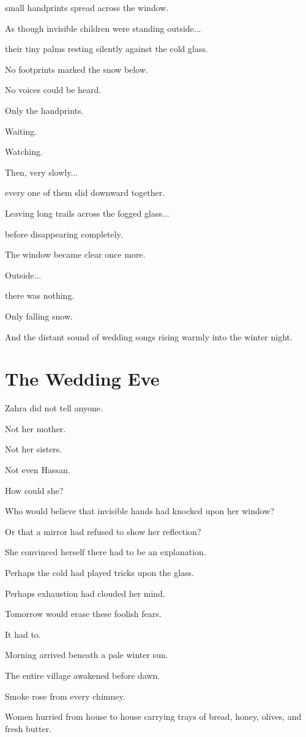 \documentclass[12pt,openany]{book}
\begin{document}
small handprints spread across the window.

As though invisible children were standing outside...

their tiny palms resting silently against the cold glass.

No footprints marked the snow below.

No voices could be heard.

Only the handprints.

Waiting.

Watching.

Then, very slowly...

every one of them slid downward together.

Leaving long trails across the fogged glass...

before disappearing completely.

The window became clear once more.

Outside...

there was nothing.

Only falling snow.

And the distant sound of wedding songs rising warmly into the winter night.
\section*{The Wedding Eve}

Zahra did not tell anyone.

Not her mother.

Not her sisters.

Not even Hassan.

How could she?

Who would believe that invisible hands had knocked upon her window?

Or that a mirror had refused to show her reflection?

She convinced herself there had to be an explanation.

Perhaps the cold had played tricks upon the glass.

Perhaps exhaustion had clouded her mind.

Tomorrow would erase these foolish fears.

It had to.

Morning arrived beneath a pale winter sun.

The entire village awakened before dawn.

Smoke rose from every chimney.

Women hurried from house to house carrying trays of bread, honey, olives, and fresh butter.
\end{document}
